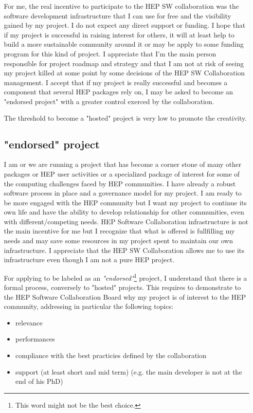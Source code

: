 \documentclass[11pt]{article} %
\begin{document}
For me, the real incentive to participate to the HEP SW collaboration was the software development infrastructure
that I can use for free and the visibility gained by my project. I do not expect any direct support or funding. I hope that
if my project is successful in raising interest for others, it will at least help to build a more sustainable community around
it or may be apply to some funding program for this kind of project. I appreciate that I'm the main person responsible for project
roadmap and strategy and that I am not at risk of seeing my project killed at some point by some decisions of the HEP SW Collaboration
management. I accept that if my project is really successful and becomes a component that several HEP packages rely on, I may be
asked to become an "endorsed project" with a greater control exerced by the collaboration.

The threshold to become a "hosted" project is very low to promote the creativity. 


\subsection{"endorsed" project }

I am or we are running a project that has become a corner stone of many other packages or HEP user activities or a specialized package of
interest for some of the computing challenges faced by HEP communities. I have already a robust software process in place and a governance model
for my project. I am ready to be more engaged with the HEP community but I want my project to continue its own life and have the ability to
develop relationship for other communities, even with different/competing needs. HEP Software Collaboration infrastructure is not the main incentive
for me but I recognize that what is offered is fullfilling my needs and may save some resources in my project spent to maintain our own infrastructure.
I appreciate that the HEP SW Collaboration allows me to use its infrastructure even though I am not a pure HEP project.

For applying to be labeled as an {\em "endorsed"}\footnote{This word might not be the best choice.} project, I understand that there is a formal
process, conversely to "hosted" projects. This requires to demonstrate to the HEP Software Collaboration Board why my project is of interest to the
HEP community, addressing in particular the following topics:
\begin{itemize}
\item relevance
\item performances 
\item compliance with the best practicies defined by the collaboration 
\item support (at least short and mid term) (e.g. the main developer is not at the end of his PhD) 
\end{itemize}
\end{document}
